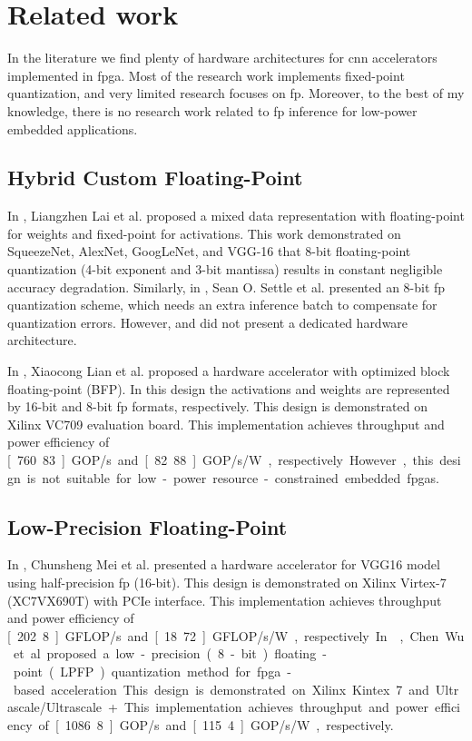 \section{Related work}
\label{sec:related_work}
In the literature we find plenty of hardware architectures for \gls{cnn} accelerators implemented in \gls{fpga}. Most of the research work implements fixed-point quantization, and very limited research focuses on \gls{fp}. Moreover, to the best of my knowledge, there is no research work related to \gls{fp} inference for low-power embedded applications.


\subsection{Hybrid Custom Floating-Point}
In \cite{lai2017deep}, Liangzhen Lai et al. proposed a mixed data representation with floating-point for weights and fixed-point for activations. This work demonstrated on SqueezeNet, AlexNet, GoogLeNet, and VGG-16 that 8-bit floating-point quantization (4-bit exponent and 3-bit mantissa) results in constant negligible accuracy degradation. Similarly, in \cite{settle2018quantizing}, Sean O. Settle et al. presented an 8-bit \gls{fp} quantization scheme, which needs an extra inference batch to compensate for quantization errors. However, \cite{lai2017deep} and \cite{settle2018quantizing} did not present a dedicated hardware architecture.

In \cite{lian2019high}, Xiaocong Lian et al. proposed a hardware accelerator with optimized block floating-point (BFP). In this design the activations and weights are represented by 16-bit and 8-bit \gls{fp} formats, respectively. This design is demonstrated on Xilinx VC709 evaluation board. This implementation achieves throughput and power efficiency of \unit[760.83]{GOP/s} and \unit[82.88]{GOP/s/W}, respectively. However, this design is not suitable for low-power resource-constrained embedded \glspl{fpga}.

\subsection{Low-Precision Floating-Point}
In \cite{mei2017200mhz}, Chunsheng Mei et al. presented a hardware accelerator for VGG16 model using half-precision \gls{fp} (16-bit). This design is demonstrated on Xilinx Virtex-7 (XC7VX690T) with PCIe interface. This implementation achieves throughput and power efficiency of \unit[202.8]{GFLOP/s} and \unit[18.72]{GFLOP/s/W}, respectively. In \cite{wu2021low}, Chen Wu et al. proposed a low-precision (8-bit) floating-point (LPFP) quantization method for \gls{fpga}-based acceleration. This design is demonstrated on Xilinx Kintex 7 and Ultrascale/Ultrascale+. This implementation achieves throughput and power efficiency of \unit[1086.8]{GOP/s} and \unit[115.4]{GOP/s/W}, respectively.

